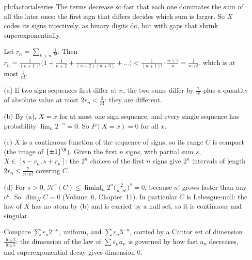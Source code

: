 \begin{solution}{pb:factorialseries}
\idea The terms decrease so fast that each one dominates the sum of all the later ones: the first sign that differs decides which sum is larger. So $X$ codes its signs
injectively, as binary digits do, but with gaps that shrink superexponentially.

\writeup Let $r_n=\sum_{k>n}\frac1{k!}$. Then $r_n=\frac1{(n+1)!}\bigl(1+\frac1{n+2}+\frac1{(n+2)(n+3)}+\dots\bigr)<\frac1{(n+1)!}\cdot\frac{n+1}n=\frac1{n\cdot n!}$, which is at most $\frac1{n!}$.

(a) If two sign sequences first differ at $n$, the two sums differ by $\frac2{n!}$ plus a quantity of absolute value at most $2r_n<\frac2{n!}$: they are different.

(b) By (a), $X=x$ for at most one sign sequence, and every single sequence has probability $\lim_n2^{-n}=0$. So $P(X=x)=0$ for all $x$.

(c) $X$ is a continuous function of the sequence of signs, so its range $C$ is compact (the image of $\{\pm1\}^{\N}$). Given the first $n$ signs, with partial sum $s$,
$X\in[s-r_n,s+r_n]$: the $2^n$ choices of the first $n$ signs give $2^n$ intervals of length $2r_n\le\frac2{n\cdot n!}$ covering $C$.

(d) For $s>0$, $\mathcal H^s(C)\le\liminf_n2^n\bigl(\frac2{n\cdot n!}\bigr)^s=0$, because $n!$ grows faster than any $c^n$. So $\dim_HC=0$ (Volume~6, Chapter~11). In particular $C$ is
Lebesgue-null: the law of $X$ has no atom by (b) and is carried by a null set, so it is continuous and singular.

\leads Compare $\sum\varepsilon_n2^{-n}$, uniform, and $\sum\varepsilon_n3^{-n}$, carried by a Cantor set of dimension $\frac{\log2}{\log3}$: the dimension of the law of
$\sum\varepsilon_na_n$ is governed by how fast $a_n$ decreases, and superexponential decay gives dimension $0$.
\end{solution}

